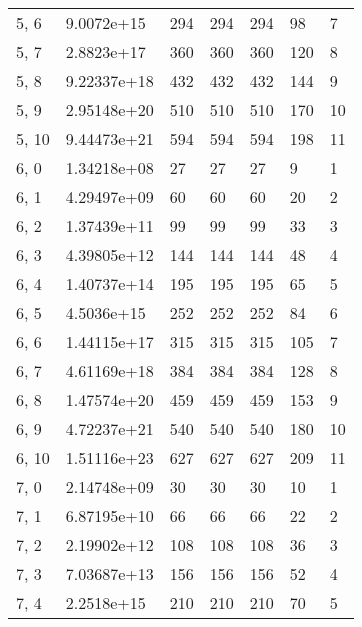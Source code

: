\begin{table}
\begin{tabular}{lllllll}
5, 6   &   9.0072e+15 &         294 &       294 &         294 &       98 &     7 \\
5, 7   &   2.8823e+17 &         360 &       360 &         360 &      120 &     8 \\
5, 8   &  9.22337e+18 &         432 &       432 &         432 &      144 &     9 \\
5, 9   &  2.95148e+20 &         510 &       510 &         510 &      170 &    10 \\
5, 10  &  9.44473e+21 &         594 &       594 &         594 &      198 &    11 \\
6, 0   &  1.34218e+08 &          27 &        27 &          27 &        9 &     1 \\
6, 1   &  4.29497e+09 &          60 &        60 &          60 &       20 &     2 \\
6, 2   &  1.37439e+11 &          99 &        99 &          99 &       33 &     3 \\
6, 3   &  4.39805e+12 &         144 &       144 &         144 &       48 &     4 \\
6, 4   &  1.40737e+14 &         195 &       195 &         195 &       65 &     5 \\
6, 5   &   4.5036e+15 &         252 &       252 &         252 &       84 &     6 \\
6, 6   &  1.44115e+17 &         315 &       315 &         315 &      105 &     7 \\
6, 7   &  4.61169e+18 &         384 &       384 &         384 &      128 &     8 \\
6, 8   &  1.47574e+20 &         459 &       459 &         459 &      153 &     9 \\
6, 9   &  4.72237e+21 &         540 &       540 &         540 &      180 &    10 \\
6, 10  &  1.51116e+23 &         627 &       627 &         627 &      209 &    11 \\
7, 0   &  2.14748e+09 &          30 &        30 &          30 &       10 &     1 \\
7, 1   &  6.87195e+10 &          66 &        66 &          66 &       22 &     2 \\
7, 2   &  2.19902e+12 &         108 &       108 &         108 &       36 &     3 \\
7, 3   &  7.03687e+13 &         156 &       156 &         156 &       52 &     4 \\
7, 4   &   2.2518e+15 &         210 &       210 &         210 &       70 &     5 \\

\end{tabular}
\end{table}

